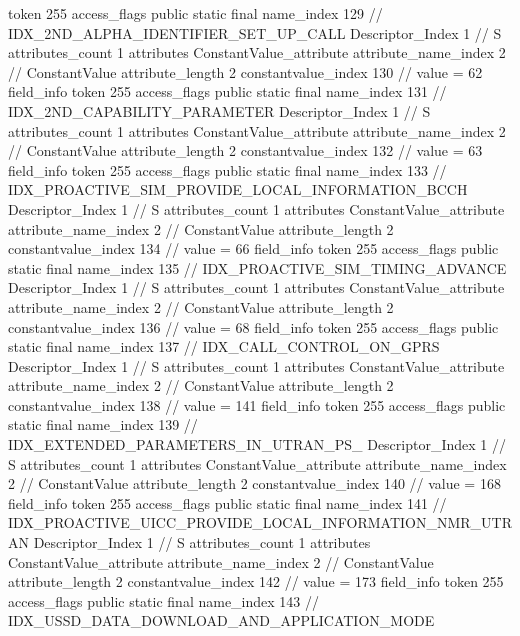 {{{{{				token	255
				access_flags	public static final
				name_index	129		// IDX_2ND_ALPHA_IDENTIFIER_SET_UP_CALL
				Descriptor_Index	1		// S
				attributes_count	1
				attributes {
				ConstantValue_attribute {
					attribute_name_index	2		// ConstantValue
					attribute_length	2
					constantvalue_index	130		// value = 62
				}
				}
			}
			field_info {
				token	255
				access_flags	public static final
				name_index	131		// IDX_2ND_CAPABILITY_PARAMETER
				Descriptor_Index	1		// S
				attributes_count	1
				attributes {
				ConstantValue_attribute {
					attribute_name_index	2		// ConstantValue
					attribute_length	2
					constantvalue_index	132		// value = 63
				}
				}
			}
			field_info {
				token	255
				access_flags	public static final
				name_index	133		// IDX_PROACTIVE_SIM_PROVIDE_LOCAL_INFORMATION_BCCH
				Descriptor_Index	1		// S
				attributes_count	1
				attributes {
				ConstantValue_attribute {
					attribute_name_index	2		// ConstantValue
					attribute_length	2
					constantvalue_index	134		// value = 66
				}
				}
			}
			field_info {
				token	255
				access_flags	public static final
				name_index	135		// IDX_PROACTIVE_SIM_TIMING_ADVANCE
				Descriptor_Index	1		// S
				attributes_count	1
				attributes {
				ConstantValue_attribute {
					attribute_name_index	2		// ConstantValue
					attribute_length	2
					constantvalue_index	136		// value = 68
				}
				}
			}
			field_info {
				token	255
				access_flags	public static final
				name_index	137		// IDX_CALL_CONTROL_ON_GPRS
				Descriptor_Index	1		// S
				attributes_count	1
				attributes {
				ConstantValue_attribute {
					attribute_name_index	2		// ConstantValue
					attribute_length	2
					constantvalue_index	138		// value = 141
				}
				}
			}
			field_info {
				token	255
				access_flags	public static final
				name_index	139		// IDX_EXTENDED_PARAMETERS_IN_UTRAN_PS_
				Descriptor_Index	1		// S
				attributes_count	1
				attributes {
				ConstantValue_attribute {
					attribute_name_index	2		// ConstantValue
					attribute_length	2
					constantvalue_index	140		// value = 168
				}
				}
			}
			field_info {
				token	255
				access_flags	public static final
				name_index	141		// IDX_PROACTIVE_UICC_PROVIDE_LOCAL_INFORMATION_NMR_UTRAN
				Descriptor_Index	1		// S
				attributes_count	1
				attributes {
				ConstantValue_attribute {
					attribute_name_index	2		// ConstantValue
					attribute_length	2
					constantvalue_index	142		// value = 173
				}
				}
			}
			field_info {
				token	255
				access_flags	public static final
				name_index	143		// IDX_USSD_DATA_DOWNLOAD_AND_APPLICATION_MODE
}}}}}

